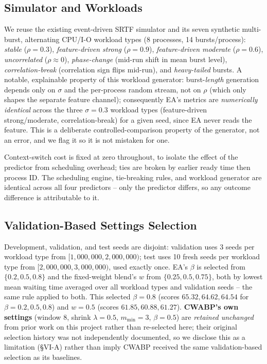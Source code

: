 \documentclass[10pt,twocolumn]{article}
\begin{document}
\subsection{Simulator and Workloads}
We reuse the existing event-driven SRTF simulator and its seven synthetic multi-burst, alternating CPU/I-O workload types (8 processes, 14 bursts/process): \emph{stable} ($\rho{=}0.3$), \emph{feature-driven strong} ($\rho{=}0.9$), \emph{feature-driven moderate} ($\rho{=}0.6$), \emph{uncorrelated} ($\rho{\approx}0$), \emph{phase-change} (mid-run shift in mean burst level), \emph{correlation-break} (correlation sign flips mid-run), and \emph{heavy-tailed} bursts. A notable, explainable property of this workload generator: burst-\emph{length} generation depends only on $\sigma$ and the per-process random stream, not on $\rho$ (which only shapes the separate feature channel); consequently EA's metrics are \emph{numerically identical} across the three $\sigma{=}0.3$ workload types (feature-driven strong/moderate, correlation-break) for a given seed, since EA never reads the feature. This is a deliberate controlled-comparison property of the generator, not an error, and we flag it so it is not mistaken for one.

Context-switch cost is fixed at zero throughout, to isolate the effect of the predictor from scheduling overhead; ties are broken by earlier ready time then process ID. The scheduling engine, tie-breaking rules, and workload generator are identical across all four predictors -- only the predictor differs, so any outcome difference is attributable to it.

\subsection{Validation-Based Settings Selection}
Development, validation, and test seeds are disjoint: validation uses 3 seeds per workload type from $[1{,}000{,}000,2{,}000{,}000)$; test uses 10 fresh seeds per workload type from $[2{,}000{,}000,3{,}000{,}000)$, used exactly once. EA's $\beta$ is selected from $\{0.2,0.5,0.8\}$ and the fixed-weight blend's $w$ from $\{0.25,0.5,0.75\}$, both by lowest mean waiting time averaged over all workload types and validation seeds -- the same rule applied to both. This selected $\beta{=}0.8$ (scores $65.32,64.62,64.54$ for $\beta{=}0.2,0.5,0.8$) and $w{=}0.5$ (scores $61.85,60.88,61.27$). \textbf{CWABP's own settings} (window $8$, shrink $\lambda{=}0.5$, $m_{\min}{=}3$, $\beta{=}0.5$) are \emph{retained unchanged} from prior work on this project rather than re-selected here; their original selection history was not independently documented, so we disclose this as a limitation (\S VI-A) rather than imply CWABP received the same validation-based selection as its baselines.
\end{document}
